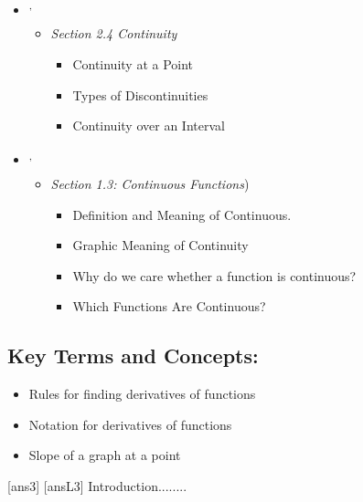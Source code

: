 \begin{framed}
\begin{itemize}
\item \cite{openstax}\footnotemark[2]\textsuperscript{,}\footnotemark[3]
    \begin{itemize}
        \item \emph{Section 2.4 Continuity}
        \begin{itemize}
            \item Continuity at a Point
            \item Types of Discontinuities
            \item Continuity over an Interval
        \end{itemize}
    \end{itemize}
\item \cite{Hoffman}\footnotemark[3]\textsuperscript{,}\footnotemark[4]
    \begin{itemize}
        \item \emph{Section 1.3: Continuous Functions})
        \begin{itemize}
            \item Definition and Meaning of Continuous.
           \item Graphic Meaning of Continuity
            \item Why do we care whether a function is continuous?
            \item Which Functions Are Continuous?
        \end{itemize}
        
    \end{itemize}
\end{itemize}
\subsection*{Key Terms and Concepts:} 

\begin{multicols}{2}
\begin{itemize}
    \item Rules for finding derivatives of functions
    \item Notation for derivatives of functions
    \item Slope of a graph at a point
\end{itemize}
\end{multicols}
\end{framed}
\newpage
[ans3]
[ansL3]
\noindent Introduction........

